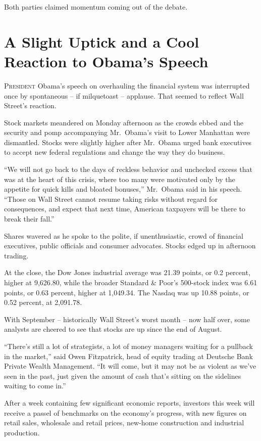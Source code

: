 ﻿\documentclass[12pt]{article}
\begin{document}
Both parties claimed momentum coming out of the debate.

\section{A Slight Uptick and a Cool Reaction to Obama's Speech}

\lettrine{P}{resident} Obama's speech on overhauling the financial system was interrupted once by
spontaneous\cite{spontaneous} -- if milquetoast\cite{milquetoast} -- applause. That seemed to
reflect Wall Street's reaction.

Stock markets meandered\cite{meander} on Monday afternoon as the crowds ebbed\cite{ebb} and the
security and pomp accompanying Mr.~Obama's visit to Lower Manhattan were dismantled. Stocks were
slightly higher after Mr.~Obama urged bank executives to accept new federal regulations and change
the way they do business.

``We will not go back to the days of reckless behavior and unchecked excess that was at the heart of
this crisis, where too many were motivated only by the appetite for quick kills and bloated
bonuses,'' Mr.~Obama said in his speech. ``Those on Wall Street cannot resume taking risks without
regard for consequences, and expect that next time, American taxpayers will be there to break their
fall.''

Shares wavered as he spoke to the polite, if unenthusiastic, crowd of financial executives, public
officials and consumer advocates. Stocks edged up in afternoon trading.

At the close, the Dow Jones industrial average was 21.39 points, or 0.2 percent, higher at 9,626.80,
while the broader Standard \& Poor's 500-stock index was 6.61 points, or 0.63 percent, higher at
1,049.34. The Nasdaq was up 10.88 points, or 0.52 percent, at 2,091.78.

With September -- historically Wall Street's worst month -- now half over, some analysts are cheered
to see that stocks are up since the end of August.

``There's still a lot of strategists, a lot of money managers waiting for a pullback in the
market,'' said Owen Fitzpatrick, head of equity trading at Deutsche Bank Private Wealth Management.
``It will come, but it may not be as violent as we've seen in the past, just given the amount of
cash that's sitting on the sidelines waiting to come in.''

After a week containing few significant economic reports, investors this week will receive a
passel\cite{passel} of benchmarks on the economy's progress, with new figures on retail sales,
wholesale and retail prices, new-home construction and industrial production.
\end{document}
